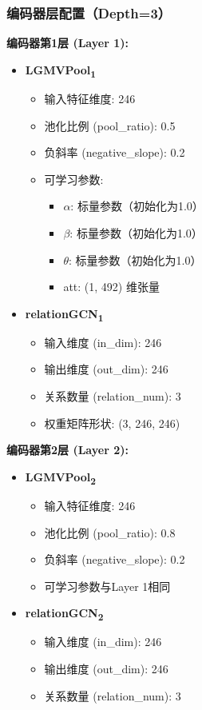 \documentclass[UTF8, a4paper, 12pt]{article}
\begin{document}
\subsubsection{编码器层配置（Depth=3）}

\textbf{编码器第1层 (Layer 1):}

\begin{itemize}
    \item \textbf{LGMVPool\textsubscript{1}}
    \begin{itemize}
        \item 输入特征维度: 246
        \item 池化比例 (pool\_ratio): 0.5
        \item 负斜率 (negative\_slope): 0.2
        \item 可学习参数:
        \begin{itemize}
            \item $\alpha$: 标量参数（初始化为1.0）
            \item $\beta$: 标量参数（初始化为1.0）
            \item $\theta$: 标量参数（初始化为1.0）
            \item att: (1, 492) 维张量
        \end{itemize}
    \end{itemize}
    \item \textbf{relationGCN\textsubscript{1}}
    \begin{itemize}
        \item 输入维度 (in\_dim): 246
        \item 输出维度 (out\_dim): 246
        \item 关系数量 (relation\_num): 3
        \item 权重矩阵形状: (3, 246, 246)
    \end{itemize}
\end{itemize}

\textbf{编码器第2层 (Layer 2):}

\begin{itemize}
    \item \textbf{LGMVPool\textsubscript{2}}
    \begin{itemize}
        \item 输入特征维度: 246
        \item 池化比例 (pool\_ratio): 0.8
        \item 负斜率 (negative\_slope): 0.2
        \item 可学习参数与Layer 1相同
    \end{itemize}
    \item \textbf{relationGCN\textsubscript{2}}
    \begin{itemize}
        \item 输入维度 (in\_dim): 246
        \item 输出维度 (out\_dim): 246
        \item 关系数量 (relation\_num): 3
    \end{itemize}
\end{itemize}
\end{document}
